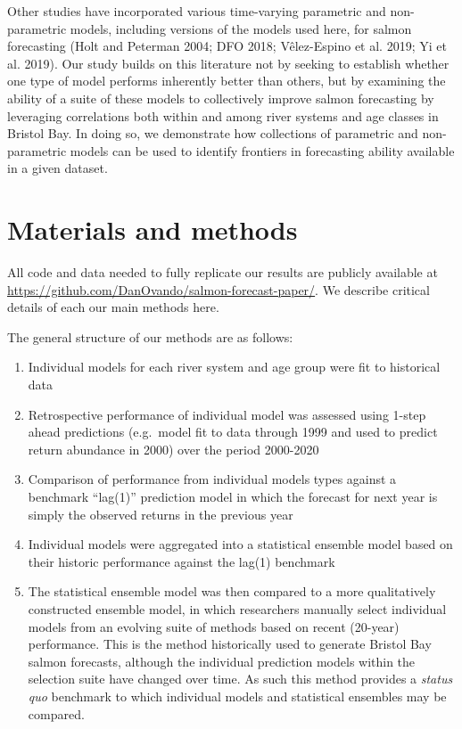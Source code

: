 \documentclass[
]{article}
\begin{document}
Other studies have incorporated various time-varying parametric and non-parametric models, including versions of the models used here, for salmon forecasting (Holt and Peterman 2004; DFO 2018; Vêlez-Espino et al. 2019; Yi et al. 2019). Our study builds on this literature not by seeking to establish whether one type of model performs inherently better than others, but by examining the ability of a suite of these models to collectively improve salmon forecasting by leveraging correlations both within and among river systems and age classes in Bristol Bay. In doing so, we demonstrate how collections of parametric and non-parametric models can be used to identify frontiers in forecasting ability available in a given dataset.

\hypertarget{materials-and-methods}{%
\section{Materials and methods}\label{materials-and-methods}}

All code and data needed to fully replicate our results are publicly available at \url{https://github.com/DanOvando/salmon-forecast-paper/}. We describe critical details of each our main methods here.

The general structure of our methods are as follows:

\begin{enumerate}
\def\labelenumi{\arabic{enumi}.}
\item
  Individual models for each river system and age group were fit to historical data
\item
  Retrospective performance of individual model was assessed using 1-step ahead predictions (e.g.~model fit to data through 1999 and used to predict return abundance in 2000) over the period 2000-2020
\item
  Comparison of performance from individual models types against a benchmark ``lag(1)'' prediction model in which the forecast for next year is simply the observed returns in the previous year
\item
  Individual models were aggregated into a statistical ensemble model based on their historic performance against the lag(1) benchmark
\item
  The statistical ensemble model was then compared to a more qualitatively constructed ensemble model, in which researchers manually select individual models from an evolving suite of methods based on recent (20-year) performance. This is the method historically used to generate Bristol Bay salmon forecasts, although the individual prediction models within the selection suite have changed over time. As such this method provides a \emph{status quo} benchmark to which individual models and statistical ensembles may be compared.
\end{enumerate}
\end{document}
